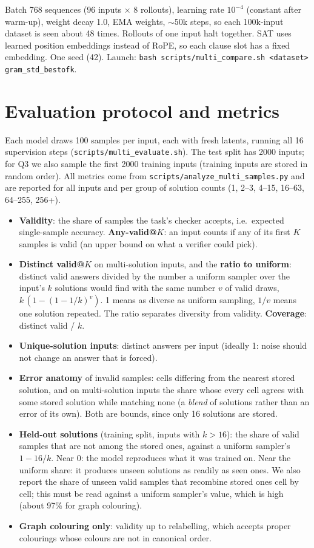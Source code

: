 \documentclass[11pt]{article}
\begin{document}
Batch 768 sequences ($96$ inputs $\times$ 8 rollouts), learning rate $10^{-4}$ (constant after warm-up), weight decay
1.0, EMA weights, $\sim$50k steps, so each 100k-input dataset is seen about 48 times. Rollouts of one input halt
together. SAT uses learned position embeddings instead of RoPE, so each clause slot has a fixed embedding. One seed
(42). Launch: \texttt{bash scripts/multi\_compare.sh <dataset> gram\_std\_bestofk}.

\section{Evaluation protocol and metrics}

Each model draws 100 samples per input, each with fresh latents, running all 16 supervision steps
(\texttt{scripts/multi\_evaluate.sh}). The test split has 2000 inputs; for Q3 we also sample the first 2000 training
inputs (training inputs are stored in random order). All metrics come from \texttt{scripts/analyze\_multi\_samples.py}
and are reported for all inputs and per group of solution counts (1, 2--3, 4--15, 16--63, 64--255, 256+).

\begin{itemize}
  \item \textbf{Validity}: the share of samples the task's checker accepts, i.e.\ expected single-sample accuracy.
  \textbf{Any-valid@$K$}: an input counts if any of its first $K$ samples is valid (an upper bound on what a verifier
  could pick).
  \item \textbf{Distinct valid@$K$} on multi-solution inputs, and the \textbf{ratio to uniform}: distinct valid
  answers divided by the number a uniform sampler over the input's $k$ solutions would find with the same number $v$
  of valid draws, $k\,(1-(1-1/k)^{v})$. 1 means as diverse as uniform sampling, $1/v$ means one solution repeated. The
  ratio separates diversity from validity. \textbf{Coverage}: distinct valid / $k$.
  \item \textbf{Unique-solution inputs}: distinct answers per input (ideally 1: noise should not change an answer that
  is forced).
  \item \textbf{Error anatomy} of invalid samples: cells differing from the nearest stored solution, and on
  multi-solution inputs the share whose every cell agrees with some stored solution while matching none (a
  \emph{blend} of solutions rather than an error of its own). Both are bounds, since only 16 solutions are stored.
  \item \textbf{Held-out solutions} (training split, inputs with $k>16$): the share of valid samples that are not among
  the stored ones, against a uniform sampler's $1-16/k$. Near 0: the model reproduces what it was trained on. Near
  the uniform share: it produces unseen solutions as readily as seen ones. We also report the share of unseen valid
  samples that recombine stored ones cell by cell; this must be read against a uniform sampler's value, which is high
  (about 97\% for graph colouring).
  \item \textbf{Graph colouring only}: validity up to relabelling, which accepts proper colourings whose colours are
  not in canonical order.
\end{itemize}
\end{document}
